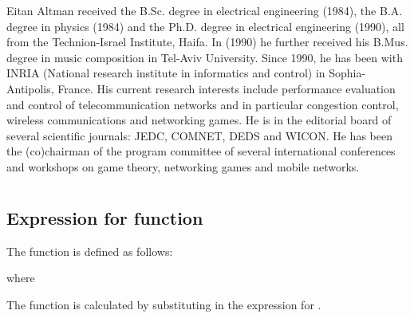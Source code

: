 \documentclass[10pt,journal]{IEEEtran}
\begin{document}
    
    \vspace{-10mm}
  
    
   
   \begin{IEEEbiography}
   {Eitan Altman}  received the B.Sc. degree in electrical
engineering (1984), the B.A. degree in
physics (1984) and the Ph.D. degree in electrical
engineering (1990), all from the Technion-Israel
Institute, Haifa. In (1990) he further received his
B.Mus. degree in music composition in Tel-Aviv
University. Since 1990, he has been with INRIA
(National research institute in informatics and
control) in Sophia-Antipolis, France. His current
research interests include performance evaluation
and control of telecommunication networks and
in particular congestion control, wireless communications and networking
games. He is in the editorial board of several scientific journals: JEDC,
COMNET, DEDS and WICON. He has been the (co)chairman of the
program committee of several international conferences and workshops
on game theory, networking games and mobile networks.
   \end{IEEEbiography}
   
   









\renewcommand{\thesubsection}{\Alph{subsection}}











\appendices
 

 \section{}\label{appendix}
 
 \subsection{Expression for  function}
 \label{subsection:expression-for-Jn}
 
 The function  is defined as follows:
 
 \footnotesize
 
\normalsize
  where 
  

 The function  is calculated by substituting  in the expression for 
 .
 
\end{document}
